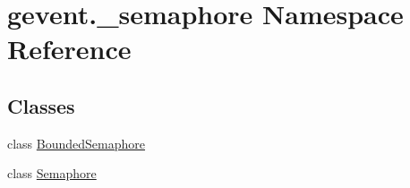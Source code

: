 \hypertarget{namespacegevent_1_1__semaphore}{}\section{gevent.\+\_\+semaphore Namespace Reference}
\label{namespacegevent_1_1__semaphore}
\subsection*{Classes}
\begin{DoxyCompactItemize}
\item 
class \hyperlink{classgevent_1_1__semaphore_1_1_bounded_semaphore}{Bounded\+Semaphore}
\item 
class \hyperlink{classgevent_1_1__semaphore_1_1_semaphore}{Semaphore}
\end{DoxyCompactItemize}
